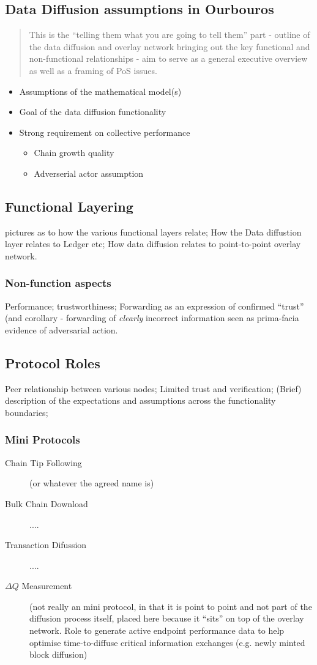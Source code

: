 \documentclass{report}
\theoremstyle{definition}{
  \newtheorem{lemma}{Lemma}[section] %
  \newtheorem{definition}[lemma]{Definition}
}
\theoremstyle{theorem}{
  \newtheorem{invariant}[lemma]{Invariant}
  \newtheorem{proofobligation}[lemma]{Proof Obligation}
}
\numberwithin{equation}{lemma}
\begin{document}
\subsection{Data Diffusion assumptions in Ourbouros}
\begin{quote}
  This is the ``telling them what you are going to tell them'' part -
  outline of the data diffusion and overlay network bringing out the
  key functional and non-functional relationships - aim to serve as a
  general executive overview as well as a framing of PoS issues.
\end{quote}
\begin{itemize}
  \item Assumptions of the mathematical model(s)
  \item Goal of the data diffusion functionality
  \item Strong requirement on collective performance
  \begin{itemize}
    \item Chain growth quality
    \item Adverserial actor assumption
  \end{itemize}
\end{itemize}
\subsection{Functional Layering}
pictures as to how the various functional layers relate; How the Data
diffustion layer relates to Ledger etc; How data diffusion relates to
point-to-point overlay network.

\subsubsection{Non-function aspects}
Performance; trustworthiness; Forwarding as an expression of confirmed
``trust'' (and corollary - forwarding of \emph{clearly} incorrect information
seen as prima-facia evidence of adversarial action.
\subsection{Protocol Roles}
Peer relationship between various nodes; Limited trust and
verification; (Brief) description of the expectations and assumptions across
the functionality boundaries; 

\subsubsection{Mini Protocols}
\begin{description}
\item[Chain Tip Following] (or whatever the agreed name is)
\item[Bulk Chain Download] ....
\item[Transaction Difussion] ....
\item[$\Delta Q$ Measurement] (not really an mini protocol, in that it
  is point to point and not part of the diffusion process itself,
  placed here because it ``sits'' on top of the overlay network. Role
  to generate active endpoint performance data to help optimise
  time-to-diffuse critical information exchanges (e.g. newly minted
  block diffusion)
\end{description}  
\end{document}

